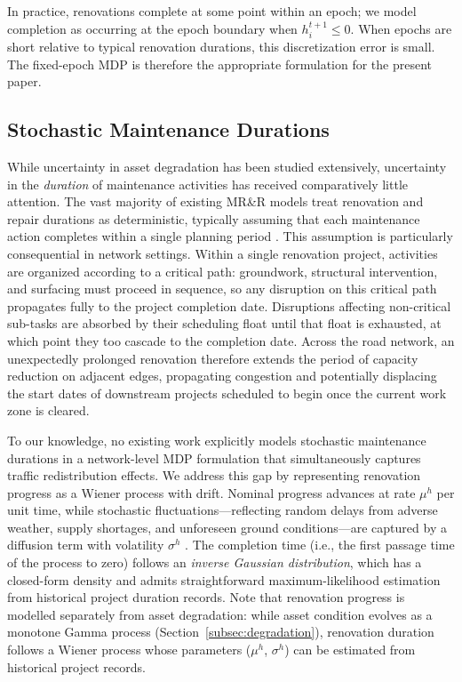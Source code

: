 \documentclass[3p, twocolumn]{elsarticle}
\begin{document}
In practice, renovations complete at some point within an epoch; we model completion as occurring at the epoch boundary when $h_i^{t+1} \leq 0$. When epochs are short relative to typical renovation durations, this discretization error is small. The fixed-epoch MDP is therefore the appropriate formulation for the present paper.


\subsection{Stochastic Maintenance Durations}

While uncertainty in asset degradation has been studied extensively, uncertainty in the \emph{duration} of maintenance activities has received comparatively little attention. The vast majority of existing MR\&R models treat renovation and repair durations as deterministic, typically assuming that each maintenance action completes within a single planning period \citep{ngOptimalLongTermInfrastructure2009, andriotis_managing_2019}. This assumption is particularly consequential in network settings. Within a single renovation project, activities are organized according to a critical path: groundwork, structural intervention, and surfacing must proceed in sequence, so any disruption on this critical path propagates fully to the project completion date. Disruptions affecting non-critical sub-tasks are absorbed by their scheduling float until that float is exhausted, at which point they too cascade to the completion date. Across the road network, an unexpectedly prolonged renovation therefore extends the period of capacity reduction on adjacent edges, propagating congestion and potentially displacing the start dates of downstream projects scheduled to begin once the current work zone is cleared.

To our knowledge, no existing work explicitly models stochastic maintenance durations in a network-level MDP formulation that simultaneously captures traffic redistribution effects. We address this gap by representing renovation progress as a Wiener process with drift. Nominal progress advances at rate $\mu^h$ per unit time, while stochastic fluctuations---reflecting random delays from adverse weather, supply shortages, and unforeseen ground conditions---are captured by a diffusion term with volatility $\sigma^h$ \citep{vazquez_activity_2024}. The completion time (i.e., the first passage time of the process to zero) follows an \emph{inverse Gaussian distribution}, which has a closed-form density and admits straightforward maximum-likelihood estimation from historical project duration records. Note that renovation progress is modelled separately from asset degradation: while asset condition evolves as a monotone Gamma process (Section~\ref{subsec:degradation}), renovation duration follows a Wiener process whose parameters ($\mu^h$, $\sigma^h$) can be estimated from historical project records.
\end{document}
